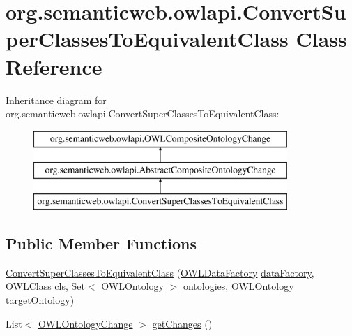 \hypertarget{classorg_1_1semanticweb_1_1owlapi_1_1_convert_super_classes_to_equivalent_class}{\section{org.\-semanticweb.\-owlapi.\-Convert\-Super\-Classes\-To\-Equivalent\-Class Class Reference}
\label{classorg_1_1semanticweb_1_1owlapi_1_1_convert_super_classes_to_equivalent_class}
}
Inheritance diagram for org.\-semanticweb.\-owlapi.\-Convert\-Super\-Classes\-To\-Equivalent\-Class\-:\begin{figure}[H]
\begin{center}
\leavevmode
\includegraphics[height=3.000000cm]{classorg_1_1semanticweb_1_1owlapi_1_1_convert_super_classes_to_equivalent_class}
\end{center}
\end{figure}
\subsection*{Public Member Functions}
\begin{DoxyCompactItemize}
\item 
\hyperlink{classorg_1_1semanticweb_1_1owlapi_1_1_convert_super_classes_to_equivalent_class_a0a5192701c91790b77b7f7c6efaef01d}{Convert\-Super\-Classes\-To\-Equivalent\-Class} (\hyperlink{interfaceorg_1_1semanticweb_1_1owlapi_1_1model_1_1_o_w_l_data_factory}{O\-W\-L\-Data\-Factory} \hyperlink{classorg_1_1semanticweb_1_1owlapi_1_1_abstract_composite_ontology_change_aebcfd0601543ebb5f72b1fe53a5352c9}{data\-Factory}, \hyperlink{interfaceorg_1_1semanticweb_1_1owlapi_1_1model_1_1_o_w_l_class}{O\-W\-L\-Class} \hyperlink{classorg_1_1semanticweb_1_1owlapi_1_1_convert_super_classes_to_equivalent_class_a38215d387a59bf28b0f25523b094542d}{cls}, Set$<$ \hyperlink{interfaceorg_1_1semanticweb_1_1owlapi_1_1model_1_1_o_w_l_ontology}{O\-W\-L\-Ontology} $>$ \hyperlink{classorg_1_1semanticweb_1_1owlapi_1_1_convert_super_classes_to_equivalent_class_aac704c5553f9affc3fc3711b59794b0a}{ontologies}, \hyperlink{interfaceorg_1_1semanticweb_1_1owlapi_1_1model_1_1_o_w_l_ontology}{O\-W\-L\-Ontology} \hyperlink{classorg_1_1semanticweb_1_1owlapi_1_1_convert_super_classes_to_equivalent_class_a2f4bbe3d725d7857c6f52cace2e1ef29}{target\-Ontology})
\item 
List$<$ \hyperlink{classorg_1_1semanticweb_1_1owlapi_1_1model_1_1_o_w_l_ontology_change}{O\-W\-L\-Ontology\-Change} $>$ \hyperlink{classorg_1_1semanticweb_1_1owlapi_1_1_convert_super_classes_to_equivalent_class_a5260eaab593e9e995a5ab0fe98d87de4}{get\-Changes} ()
\end{DoxyCompactItemize}
